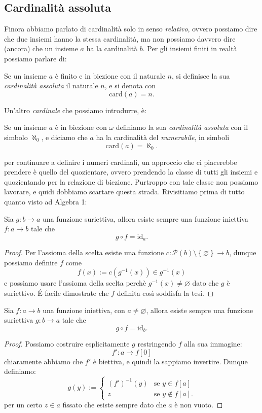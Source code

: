 \documentclass[11pt]{scrartcl}
\newcommand{\eset}{\varnothing}
\newcommand{\parti}[1]{\mathcal{P}\!\left(#1\right)}
\begin{document}
 	\subsection{Cardinalità assoluta}
 	Finora abbiamo parlato di cardinalità solo in senso \textit{relativo}, ovvero possiamo dire che due insiemi hanno la stessa cardinalità, ma non possiamo davvero dire (ancora) che un insieme $a$ ha la cardinalità $b$. Per gli insiemi finiti in realtà possiamo parlare di:
 	\begin{definition}
 		Se un insieme $a$ è finito e in biezione con il naturale $n$, si definisce la sua \textit{cardinalità assoluta} il naturale $n$, e si denota con 
 		$$\text{card}(a)=n.$$
 	\end{definition}
 	Un'altro \textit{cardinale} che possiamo introdurre, è:
 	\begin{definition}
 		Se un insieme $a$ è in biezione con $\omega$ definiamo la sua \textit{cardinalità assoluta} con il simbolo $\aleph_0$, e diciamo che $a$ ha la cardinalità del \textit{numerabile}, in simboli
 		$$\text{card}(a)=\aleph_0.$$
 	\end{definition}
 	per continuare a definire i numeri cardinali, un approccio che ci piacerebbe prendere è quello del quozientare, ovvero prendendo la classe di tutti gli insiemi e quozientando per la relazione di biezione. Purtroppo con tale classe non possiamo lavorare, e quidi dobbiamo scartare questa strada. Rivisitiamo prima di tutto quanto visto ad Algebra 1:
 	\begin{proposition}
 		Sia $g:b\to a$ una funzione suriettiva, allora esiste sempre una funzione iniettiva $f:a\to b$ tale che
 		$$g	\circ f=\text{id}_a. $$
 	\end{proposition}
 	\begin{proof}
 		Per l'assioma della scelta esiste una funzione $c:\parti{b}\setminus\left\{\eset\right\}\to b$, dunque possiamo definire $f$ come
 		$$f(x):=c\left(g^{-1}(x)\right)\in g^{-1}(x)$$
 		e possiamo usare l'assioma della scelta perchè $g^{-1}(x)\ne \eset$ dato che $g$ è suriettivo. \'E facile dimostrate che $f$ definita così soddisfa la tesi.
 	\end{proof}
 	\begin{proposition}
 		Sia $f:a\to b$ una funzione iniettiva, con $a\ne \eset$, allora esiste sempre una funzione suriettiva $g:b\to a$ tale che
 		$$g	\circ f=\text{id}_b.$$
 	\end{proposition}
 	\begin{proof}
 		Possiamo costruire esplicitamente $g$ restringendo $f$ alla sua immagine:
 		$$f':a\to f[0]$$
 		chiaramente abbiamo che $f'$ è biettiva, e quindi la sappiamo invertire. Dunque definiamo:
 		$$g(y):=\begin{cases}
 			(f')^{-1}(y)&  \text{se $y\in f[a]$} \\
 			z & \text{se $y\not\in f[a]$.}
 		\end{cases}$$
 		per un certo $z\in a$ fissato che esiste sempre dato che $a$ è non vuoto.
 	\end{proof}
 	
\end{document}
